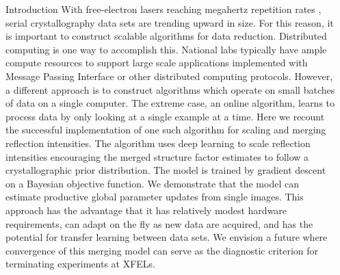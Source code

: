 \documentclass[final]{beamer}
\newlength{\sepwidth}
\newlength{\colwidth}
\newcommand{\separatorcolumn}{\begin{column}{\sepwidth}\end{column}}
\begin{document}
\begin{frame}[t]
\begin{columns}[t]
\separatorcolumn

\begin{column}{\colwidth}

  \begin{block}{Introduction}
    With free-electron lasers reaching megahertz repetition rates \cite{wiedorn_megahertz_2018}, serial crystallography data sets are trending upward in size. For this reason, it is important to construct scalable algorithms for data reduction. Distributed computing is one way to accomplish this. National labs typically have ample compute resources to support large scale applications implemented with Message Passing Interface or other distributed computing protocols. However, a different approach is to construct algorithms which operate on small batches of data on a single computer. The extreme case, an online algorithm, learns to process data by only looking at a single example at a time. Here we recount the successful implementation of one such algorithm for scaling and merging reflection intensities. The algorithm uses deep learning to scale reflection intensities encouraging the merged structure factor estimates to follow a crystallographic prior distribution. The model is trained by gradient descent on a Bayesian objective function. We demonstrate that the model can estimate productive global parameter updates from single images. This approach has the advantage that it has relatively modest hardware requirements, can adapt on the fly as new data are acquired, and has the potential for transfer learning between data sets. We envision a future where convergence of this merging model can serve as the diagnostic criterion for terminating experiments at XFELs. 
  \end{block}


\end{column}
\end{columns}
\end{frame}
\end{document}
